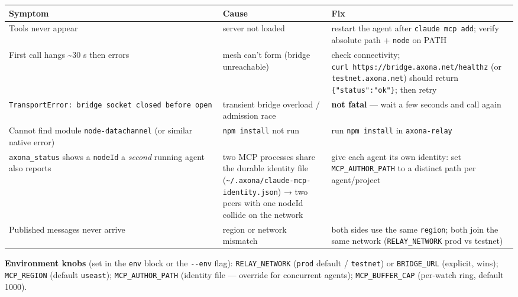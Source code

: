 \documentclass[
  nobib]{tufte-handout}
\newcounter{none} %
\begin{document}
{\def\LTcaptype{none} %
\begin{longtable}[]{@{}
  >{\raggedright\arraybackslash}p{}
  >{\raggedright\arraybackslash}p{}
  >{\raggedright\arraybackslash}p{}@{}}
\toprule\noalign{}
\begin{minipage}[b]{\linewidth}\raggedright
Symptom
\end{minipage} & \begin{minipage}[b]{\linewidth}\raggedright
Cause
\end{minipage} & \begin{minipage}[b]{\linewidth}\raggedright
Fix
\end{minipage} \\
\midrule\noalign{}
\endhead
\bottomrule\noalign{}
\endlastfoot
Tools never appear & server not loaded & restart the agent after
\texttt{claude\ mcp\ add}; verify absolute path + \texttt{node} on
PATH \\
First call hangs \textasciitilde30 s then errors & mesh can't form
(bridge unreachable) & check connectivity;
\texttt{curl\ https://bridge.axona.net/healthz} (or
\texttt{testnet.axona.net}) should return \texttt{\{"status":"ok"\}};
then retry \\
\texttt{TransportError:\ bridge\ socket\ closed\ before\ open} &
transient bridge overload / admission race & \textbf{not fatal} --- wait
a few seconds and call again \\
Cannot find module \texttt{node-datachannel} (or similar native error) &
\texttt{npm\ install} not run & run \texttt{npm\ install} in
\texttt{axona-relay} \\
\texttt{axona\_status} shows a \texttt{nodeId} a \emph{second} running
agent also reports & two MCP processes share the durable identity file
(\texttt{\textasciitilde{}/.axona/claude-mcp-identity.json}) → two peers
with one nodeId collide on the network & give each agent its own
identity: set \texttt{MCP\_AUTHOR\_PATH} to a distinct path per
agent/project \\
Published messages never arrive & region or network mismatch & both
sides use the same \texttt{region}; both join the same network
(\texttt{RELAY\_NETWORK} prod vs testnet) \\
\end{longtable}
}

\textbf{Environment knobs} (set in the \texttt{env} block or the
\texttt{-\/-env} flag): \texttt{RELAY\_NETWORK} (\texttt{prod} default /
\texttt{testnet}) or \texttt{BRIDGE\_URL} (explicit, wins);
\texttt{MCP\_REGION} (default \texttt{useast});
\texttt{MCP\_AUTHOR\_PATH} (identity file --- override for concurrent
agents); \texttt{MCP\_BUFFER\_CAP} (per-watch ring, default 1000).
\end{document}

